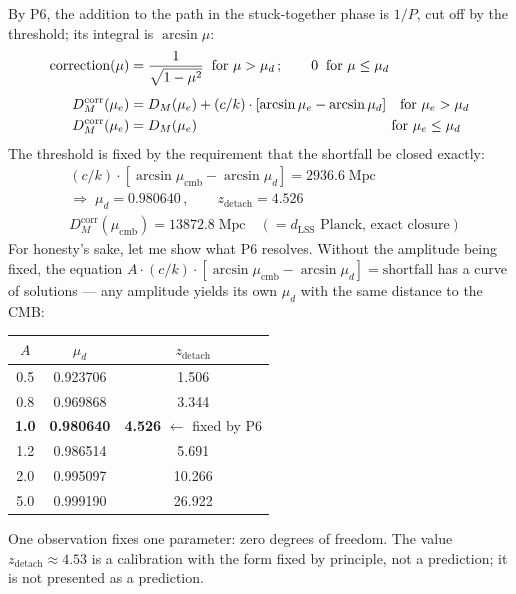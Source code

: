 \documentclass{article}
\begin{document}
By P6, the addition to the path in the stuck-together phase is $1/P$, cut off by the threshold; its integral is $\arcsin\mu$:
\begin{align*}
\text{correction}(\mu) &= \frac{1}{\sqrt{1-\mu^2}} \;\; \text{for } \mu > \mu_d\,; \qquad 0 \;\; \text{for } \mu \le \mu_d \\[4pt]
D_M^{\text{corr}}(\mu_e) &= D_M(\mu_e) + (c/k)\cdot[\arcsin\mu_e - \arcsin\mu_d] \quad \text{for } \mu_e > \mu_d \\
D_M^{\text{corr}}(\mu_e) &= D_M(\mu_e) \hspace{4.9cm} \text{for } \mu_e \le \mu_d
\end{align*}
The threshold is fixed by the requirement that the shortfall be closed exactly:
\begin{align*}
&(c/k)\cdot[\arcsin\mu_{\text{cmb}} - \arcsin\mu_d] = 2936.6\;\text{Mpc} \\
&\Rightarrow\; \mu_d = 0.980640\,, \qquad z_{\text{detach}} = 4.526 \\
&D_M^{\text{corr}}(\mu_{\text{cmb}}) = 13872.8\;\text{Mpc} \quad (= d_{\text{LSS}}\text{ Planck, exact closure})
\end{align*}
For honesty's sake, let me show what P6 resolves. Without the amplitude being fixed, the equation $A\cdot(c/k)\cdot[\arcsin\mu_{\text{cmb}} - \arcsin\mu_d] = \text{shortfall}$ has a curve of solutions --- any amplitude yields its own $\mu_d$ with the same distance to the CMB:

\begin{table}[htbp]
\centering
\small
\begin{tabular}{@{}ccc@{}}
\toprule
$A$ & $\mu_d$ & $z_{\text{detach}}$ \\
\midrule
0.5 & 0.923706 & 1.506 \\
0.8 & 0.969868 & 3.344 \\
\textbf{1.0} & \textbf{0.980640} & \textbf{4.526} \; $\leftarrow$ fixed by P6 \\
1.2 & 0.986514 & 5.691 \\
2.0 & 0.995097 & 10.266 \\
5.0 & 0.999190 & 26.922 \\
\bottomrule
\end{tabular}
\end{table}

One observation fixes one parameter: zero degrees of freedom. The value $z_{\text{detach}} \approx 4.53$ is a calibration with the form fixed by principle, not a prediction; it is not presented as a prediction.
\end{document}

